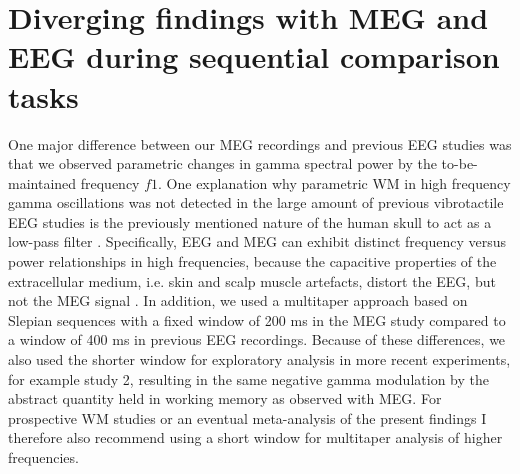 \section{Diverging findings with MEG and EEG during sequential comparison tasks}

One major difference between our MEG recordings and previous EEG studies was that we observed parametric changes in gamma spectral power by the to-be-maintained frequency $f1$. One explanation why parametric WM in high frequency gamma oscillations was not detected in the large amount of previous vibrotactile EEG studies \parencite{Herding2016,Spitzer2010,Spitzer2014,Spitzer2011,Spitzer2012} is the previously mentioned nature of the human skull to act as a low-pass filter \parencite{Pfurtscheller1975}. Specifically, EEG and MEG can exhibit distinct frequency versus power relationships in high frequencies, because the capacitive properties of the extracellular medium, i.e. skin and scalp muscle artefacts, distort the EEG, but not the MEG signal \parencite{Buzsaki2012,Dehghani2010,Demanuele2007}. In addition, we used a multitaper approach based on Slepian sequences with a fixed window of 200 ms in the MEG study compared to a window of 400 ms in previous EEG recordings. Because of these differences, we also used the shorter window for exploratory analysis in more recent experiments, for example study 2, resulting in the same negative gamma modulation by the abstract quantity held in working memory as observed with MEG. For prospective WM studies or an eventual meta-analysis of the present findings I therefore also recommend using a short window for multitaper analysis of higher frequencies.
